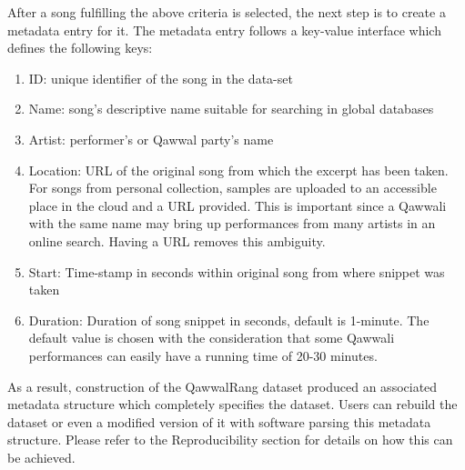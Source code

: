 \documentclass{article}
\begin{document}
After a song fulfilling the above criteria is selected, the next step is to create a metadata entry for it. The metadata entry follows a key-value interface which defines the following keys:
\begin{enumerate}
\item ID: unique identifier of the song in the data-set
\item Name: song's descriptive name suitable for searching in global databases
\item Artist: performer's or Qawwal party's name
\item Location: URL of the original song from which the excerpt has been taken. For songs from personal collection, samples are uploaded to an accessible place in the cloud and a URL provided. This is important since a Qawwali with the same name may bring up performances from many artists in an online search. Having a URL removes this ambiguity.
\item Start: Time-stamp in seconds within original song from where snippet was taken
\item Duration: Duration of song snippet in seconds, default is 1-minute. The default value is chosen with the consideration that some Qawwali performances can easily have a running time of 20-30 minutes.
\end{enumerate}

As a result, construction of the QawwalRang dataset produced an associated metadata structure which completely specifies the dataset. Users can rebuild the dataset or even a modified version of it with software parsing this metadata structure. Please refer to the Reproducibility section for details on how this can be achieved.
\end{document}
